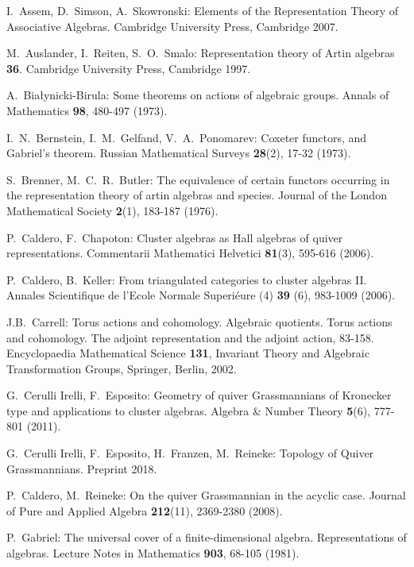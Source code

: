 \documentclass{amsart}
\numberwithin{equation}{section}
\begin{document}
\begin{thebibliography}{10}

  I.~Assem, D.~Simson, A.~Skowronski: Elements of the Representation Theory of Associative Algebras. Cambridge University Press, Cambridge 2007.

  M.~Auslander, I.~Reiten, S.~O.~Smalo: Representation theory of Artin algebras {\bf 36}. Cambridge University Press, Cambridge 1997.

  A.~Bia\l{}ynicki-Birula: Some theorems on actions of algebraic groups. Annals of Mathematics \textbf{98}, 480-497 (1973).

  I.~N.~Bernstein, I.~M.~Gelfand, V.~A.~Ponomarev: Coxeter functors, and Gabriel's theorem. Russian Mathematical Surveys \textbf{28}(2), 17-32 (1973).

  S.~Brenner, M.~C.~R.~Butler: The equivalence of certain functors occurring in the representation theory of artin algebras and species. Journal of the London Mathematical Society \textbf{2}(1), 183-187 (1976).

  P.~Caldero, F.~Chapoton: Cluster algebras as {H}all algebras of quiver representations. Commentarii Mathematici Helvetici \textbf{81}(3), 595-616 (2006).

  P.~Caldero, B.~Keller: From triangulated categories to cluster algebras II.  Annales Scientifique de l'Ecole Normale Superi\'{e}ure (4) \textbf{39} (6), 983-1009 (2006).

	J.B.~Carrell: Torus actions and cohomology. Algebraic quotients. Torus actions and cohomology. The adjoint representation and the adjoint action, 83-158. Encyclopaedia Mathematical Science \textbf{131}, Invariant Theory and Algebraic Transformation Groups, Springer, Berlin, 2002.

  G.~Cerulli Irelli, F.~Esposito: Geometry of quiver Grassmannians of Kronecker type and applications to cluster algebras. Algebra \&  Number Theory \textbf{5}(6), 777-801 (2011).

  G.~Cerulli Irelli, F.~Esposito, H.~Franzen, M.~Reineke: Topology of Quiver Grassmannians. Preprint 2018.

  P.~Caldero, M.~Reineke: On the quiver Grassmannian in the acyclic case. Journal of Pure and Applied Algebra \textbf{212}(11), 2369-2380 (2008).

  P.~Gabriel: The universal cover of a finite-dimensional algebra. Representations of algebras. Lecture Notes in Mathematics {\bf 903}, 68-105 (1981).


\end{thebibliography}
\end{document}

